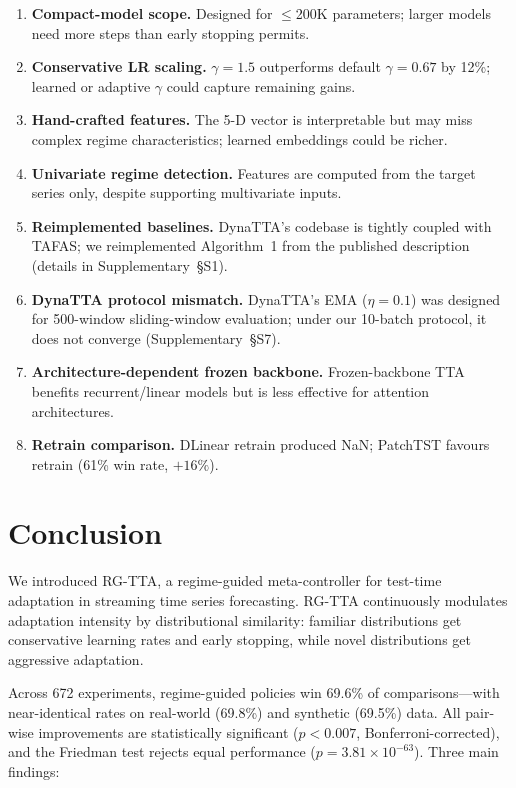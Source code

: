 \documentclass[journal]{IEEEtran}
\begin{document}
\begin{enumerate}[nosep]
  \item \textbf{Compact-model scope.} Designed for $\leq$200K parameters; larger models need more steps than early stopping permits.
  \item \textbf{Conservative LR scaling.} $\gamma{=}1.5$ outperforms default $\gamma{=}0.67$ by 12\%; learned or adaptive $\gamma$ could capture remaining gains.
  \item \textbf{Hand-crafted features.} The 5-D vector is interpretable but may miss complex regime characteristics; learned embeddings could be richer.
  \item \textbf{Univariate regime detection.} Features are computed from the target series only, despite supporting multivariate inputs.
  \item \textbf{Reimplemented baselines.} DynaTTA's codebase is tightly coupled with TAFAS; we reimplemented Algorithm~1 from the published description (details in Supplementary~\S{S1}).
  \item \textbf{DynaTTA protocol mismatch.} DynaTTA's EMA ($\eta{=}0.1$) was designed for 500-window sliding-window evaluation; under our 10-batch protocol, it does not converge (Supplementary~\S{S7}).
  \item \textbf{Architecture-dependent frozen backbone.} Frozen-backbone TTA benefits recurrent/linear models but is less effective for attention architectures.
  \item \textbf{Retrain comparison.} DLinear retrain produced NaN; PatchTST favours retrain (61\% win rate, $+16\%$).
\end{enumerate}


\section{Conclusion}
\label{sec:conclusion}

We introduced RG-TTA, a regime-guided meta-controller for test-time adaptation in streaming time series forecasting. RG-TTA continuously modulates adaptation intensity by distributional similarity: familiar distributions get conservative learning rates and early stopping, while novel distributions get aggressive adaptation.

Across 672 experiments, regime-guided policies win 69.6\% of comparisons---with near-identical rates on real-world (69.8\%) and synthetic (69.5\%) data. All pair-wise improvements are statistically significant ($p < 0.007$, Bonferroni-corrected), and the Friedman test rejects equal performance ($p = 3.81 \times 10^{-63}$). Three main findings:
\end{document}
